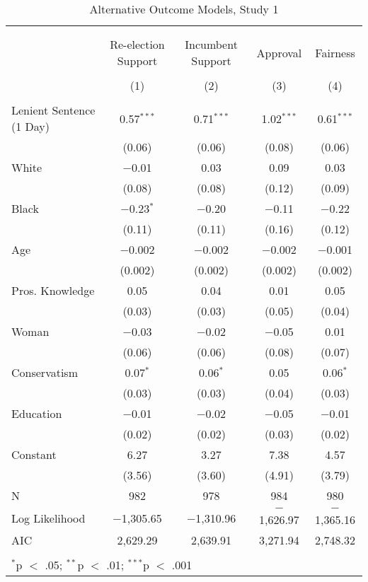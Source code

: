 \documentclass[12pt,letterpaper]{article}
\begin{document}
\begin{table}[!htbp] \centering   \caption{Alternative Outcome Models, Study 1}   \label{} \begin{tabular}{@{\extracolsep{5pt}}lcccc} \\[-1.8ex]\hline \\[-1.8ex] \\[-1.8ex] & Re-election Support & Incumbent Support & Approval & Fairness \\ \\[-1.8ex] & (1) & (2) & (3) & (4)\\ \hline \\[-1.8ex]  Lenient Sentence (1 Day) & 0.57$^{***}$ & 0.71$^{***}$ & 1.02$^{***}$ & 0.61$^{***}$ \\   & (0.06) & (0.06) & (0.08) & (0.06) \\   White & $-$0.01 & 0.03 & 0.09 & 0.03 \\   & (0.08) & (0.08) & (0.12) & (0.09) \\   Black & $-$0.23$^{*}$ & $-$0.20 & $-$0.11 & $-$0.22 \\   & (0.11) & (0.11) & (0.16) & (0.12) \\   Age & $-$0.002 & $-$0.002 & $-$0.002 & $-$0.001 \\   & (0.002) & (0.002) & (0.002) & (0.002) \\   Pros. Knowledge & 0.05 & 0.04 & 0.01 & 0.05 \\   & (0.03) & (0.03) & (0.05) & (0.04) \\   Woman & $-$0.03 & $-$0.02 & $-$0.05 & 0.01 \\   & (0.06) & (0.06) & (0.08) & (0.07) \\   Conservatism & 0.07$^{*}$ & 0.06$^{*}$ & 0.05 & 0.06$^{*}$ \\   & (0.03) & (0.03) & (0.04) & (0.03) \\   Education & $-$0.01 & $-$0.02 & $-$0.05 & $-$0.01 \\   & (0.02) & (0.02) & (0.03) & (0.02) \\   Constant & 6.27 & 3.27 & 7.38 & 4.57 \\   & (3.56) & (3.60) & (4.91) & (3.79) \\  N & 982 & 978 & 984 & 980 \\ Log Likelihood & $-$1,305.65 & $-$1,310.96 & $-$1,626.97 & $-$1,365.16 \\ AIC & 2,629.29 & 2,639.91 & 3,271.94 & 2,748.32 \\ \hline \\[-1.8ex] \multicolumn{5}{l}{$^{*}$p $<$ .05; $^{**}$p $<$ .01; $^{***}$p $<$ .001} \\ \end{tabular} \end{table} 
\end{document}
